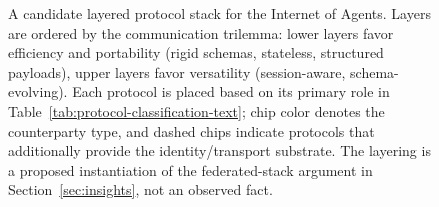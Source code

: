 \documentclass[pdflatex,sn-mathphys-num]{sn-jnl}%
\theoremstyle{thmstyleone}%
\theoremstyle{thmstyletwo}%
\theoremstyle{thmstylethree}%
\begin{document}
\begin{figure}[t]
{%
  }
  \caption{A candidate layered protocol stack for the Internet of Agents. Layers are ordered by the communication trilemma: lower layers favor efficiency and portability (rigid schemas, stateless, structured payloads), upper layers favor versatility (session-aware, schema-evolving). Each protocol is placed based on its primary role in Table~\ref{tab:protocol-classification-text}; chip color denotes the counterparty type, and dashed chips indicate protocols that additionally provide the identity/transport substrate. The layering is a proposed instantiation of the federated-stack argument in Section~\ref{sec:insights}, not an observed fact.}
  \label{fig:protocol-stack}
\end{figure}
\end{document}
